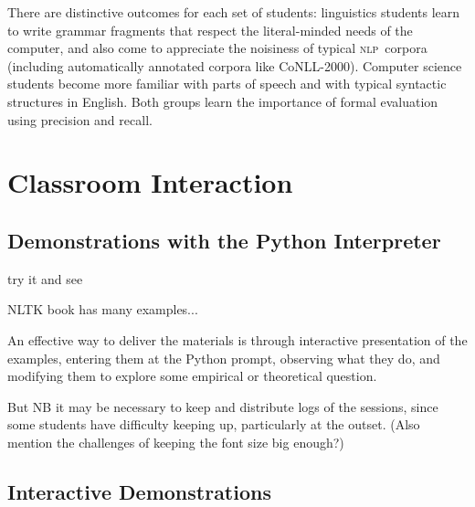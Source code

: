 \documentclass[11pt]{article}
\newcommand{\NLP}{\textsc{nlp}}
\begin{document}
There are distinctive outcomes for each set of students: linguistics students
learn to write grammar fragments that respect the literal-minded
needs of the computer, and also come to appreciate the noisiness of
typical \NLP\ corpora (including automatically annotated corpora like
CoNLL-2000).
Computer science students become more familiar with parts of speech
and with typical syntactic structures in English. Both groups learn
the importance of formal evaluation using precision and recall.






\section{Classroom Interaction}
\label{sec:classroom-interaction}

\subsection{Demonstrations with the Python Interpreter}

try it and see

NLTK book has many examples...

An effective way to deliver the materials is through interactive
presentation of the examples, entering them at the Python prompt,
observing what they do, and modifying them to explore some empirical
or theoretical question.

But NB it may be necessary to keep  and distribute logs of the sessions, since some students have
difficulty keeping up, particularly at the outset.
(Also mention the challenges of keeping the font size big enough?)

\subsection{Interactive Demonstrations}
\end{document}
